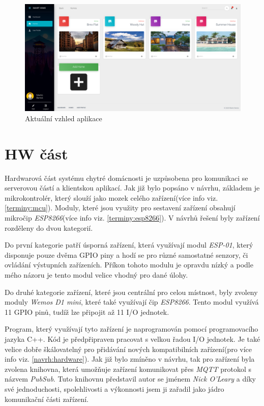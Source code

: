 \begin{figure}[hbt]
  \centering
  \includegraphics[width=1 \linewidth]{obrazky-figures/actualView.png}
  \caption{Aktuální vzhled aplikace}
  \label{figure:actual_app}
\end{figure}

\newpage
\section{HW část}
\label{impl:hw}
Hardwarová část systému chytré domácnosti je uzpůsobena pro komunikaci se serverovou částí a klientskou aplikací.
Jak již bylo popsáno v návrhu, základem je mikrokontrolér, který slouží jako mozek celého zařízení(více info viz. \ref{terminy:mcu}).
Moduly, které jsou využity pro sestavení zařízení obsahují mikročip \emph{ESP8266}(více info viz. \ref{terminy:esp8266}).
V návrhů řešení byly zařízení rozděleny do dvou kategorií.

Do první kategorie patří úsporná zařízení, která využívají modul \emph{ESP-01}, který disponuje pouze dvěma GPIO piny a hodí se pro různé samostatné senzory, či ovládání výstupních zařízeních.
Příkon tohoto modulu je opravdu nízký a podle mého názoru je tento modul velice vhodný pro dané úlohy.

Do druhé kategorie zařízení, které jsou centrální pro celou místnost, byly zvoleny moduly \emph{Wemos D1 mini}, které také využívají čip \emph{ESP8266}.
Tento modul využívá 11 GPIO pinů, tudíž lze připojit až 11 I/O jednotek.

Program, který využívají tyto zařízení je naprogramován pomocí programovacího jazyka C++.
Kód je předpřipraven pracovat s velkou řadou I/O jednotek.
Je také velice dobře škálovatelný pro přidávání nových kompatibilních zařízení(pro více info viz. \ref{navrh:hardware}).
Jak již bylo zmíněno v návrhu, tak pro zařízení byla zvolena knihovna, která umožňuje zařízení komunikovat přes \emph{MQTT} protokol s názvem \emph{PubSub}.
Tuto knihovnu představil autor se jménem \emph{Nick O'Leary} a díky své jednoduchosti, spolehlivosti a výkonnosti jsem ji zařadil jako jádro komunikační části zařízení.

